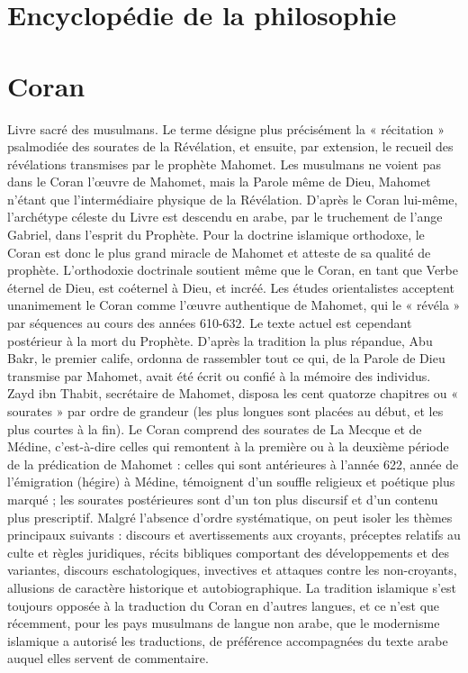 
\section{Encyclopédie de la philosophie}

\section{Coran}
Livre sacré des musulmans. Le
terme désigne plus précisément la « récitation »
psalmodiée des sourates de la
Révélation, et ensuite, par extension, le
recueil des révélations transmises par le
prophète Mahomet. Les musulmans ne
voient pas dans le Coran l’œuvre de
Mahomet, mais la Parole même de Dieu,
Mahomet n'étant que l’intermédiaire physique
de la Révélation. D’après le Coran
lui-même, l’archétype céleste du Livre est
descendu en arabe, par le truchement de
l'ange Gabriel, dans l’esprit du Prophète.
Pour la doctrine islamique orthodoxe, le
Coran est donc le plus grand miracle de
Mahomet et atteste de sa qualité de prophète.
L’orthodoxie doctrinale soutient
même que le Coran, en tant que Verbe
éternel de Dieu, est coéternel à Dieu, et
incréé. Les études orientalistes acceptent
unanimement le Coran comme l’œuvre
authentique de Mahomet, qui le « révéla »
par séquences au cours des années
610-632. Le texte actuel est cependant
postérieur à la mort du Prophète. D’après
la tradition la plus répandue, Abu Bakr,
le premier calife, ordonna de rassembler
tout ce qui, de la Parole de Dieu transmise
par Mahomet, avait été écrit ou
confié à la mémoire des individus. Zayd
ibn Thabit, secrétaire de Mahomet, disposa
les cent quatorze chapitres ou « sourates »
par ordre de grandeur (les plus
longues sont placées au début, et les plus
courtes à la fin). Le Coran comprend des
sourates de La Mecque et de Médine,
c’est-à-dire celles qui remontent à la première
ou à la deuxième période de la prédication
de Mahomet : celles qui sont
antérieures à l’année 622, année de l’émigration
(hégire) à Médine, témoignent
d’un souffle religieux et poétique plus
marqué ; les sourates postérieures sont
d’un ton plus discursif et d’un contenu
plus prescriptif. Malgré l’absence d’ordre
systématique, on peut isoler les thèmes
principaux suivants : discours et avertissements
aux croyants, préceptes relatifs au
culte et règles juridiques, récits bibliques
comportant des développements et des
variantes, discours eschatologiques, invectives
et attaques contre les non-croyants,
allusions de caractère historique et autobiographique.
La tradition islamique s’est
toujours opposée à la traduction du
Coran en d’autres langues, et ce n’est que
récemment, pour les pays musulmans de
langue non arabe, que le modernisme islamique
a autorisé les traductions, de préférence
accompagnées du texte arabe
auquel elles servent de commentaire.

